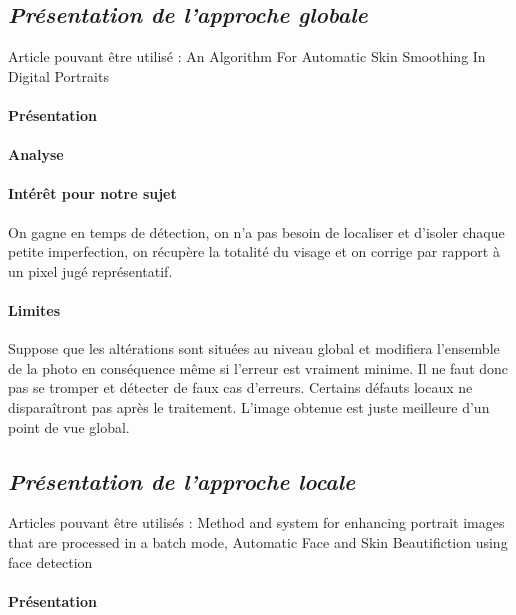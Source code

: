 \documentclass[11pt, french]{report-rd-info}
\begin{document}
\subsection{\emph{Présentation de l’approche globale}}
Article pouvant être utilisé : An Algorithm For Automatic Skin Smoothing In Digital Portraits



\paragraph{Présentation }



\paragraph{Analyse }



\paragraph{Intérêt pour notre sujet }
On gagne en temps de détection, on n’a pas besoin de localiser et d’isoler chaque petite imperfection, on récupère la totalité du visage et on corrige par rapport à un pixel jugé représentatif.
\paragraph{Limites }
Suppose que les altérations sont situées au niveau global et modifiera l’ensemble de la photo en conséquence même si l’erreur est vraiment minime. Il ne faut donc pas se tromper et détecter de faux cas d’erreurs. Certains défauts locaux ne disparaîtront pas après le traitement. L’image obtenue est juste meilleure d’un point de vue global.



\subsection{\emph{Présentation de l’approche locale}}
Articles pouvant être utilisés : Method and system for enhancing portrait images that are processed in a batch mode, Automatic Face and Skin Beautifiction using face detection



\paragraph{Présentation }
\end{document}
